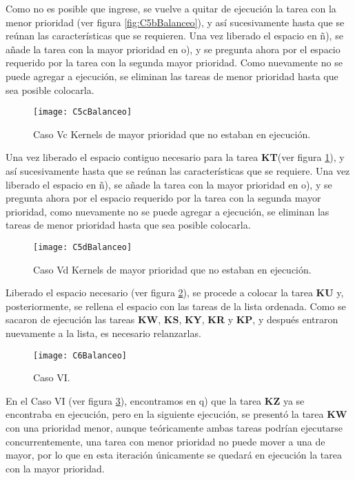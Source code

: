     Como no es posible que ingrese, se vuelve a quitar de ejecución la tarea con la menor prioridad (ver figura  \ref{fig:C5bBalanceo}), y así sucesivamente hasta que se reúnan las características que se requieren. Una vez liberado el espacio en ñ), se añade la tarea con la mayor prioridad en o), y se pregunta ahora por el espacio requerido por la tarea con la segunda mayor prioridad. Como nuevamente no se puede agregar a ejecución, se eliminan las tareas de menor prioridad hasta que sea posible colocarla.
\newline

    \begin{figure}[!]
      \centering
        \texttt{[image: C5cBalanceo]}
        \caption{Caso Vc Kernels de mayor prioridad que no estaban en ejecución.}
        \label{fig:C5cBalanceo}
    \end{figure}

    Una vez liberado el espacio contiguo necesario para la tarea \textbf{KT}(ver figura  \ref{fig:C5cBalanceo}), y así sucesivamente hasta que se reúnan las características que se requiere. Una vez liberado el espacio en ñ), se añade la tarea con la mayor prioridad en o), y se pregunta ahora por el espacio requerido por la tarea con la segunda mayor prioridad, como nuevamente no se puede agregar a ejecución, se eliminan las tareas de menor prioridad hasta que sea posible colocarla.
\newline
    
    \begin{figure}[!]
      \centering
        \texttt{[image: C5dBalanceo]}
        \caption{Caso Vd Kernels de mayor prioridad que no estaban en ejecución.}
        \label{fig:C5dBalanceo}
    \end{figure}

   Liberado el espacio necesario (ver figura  \ref{fig:C5dBalanceo}), se procede a colocar la tarea \textbf{KU} y, posteriormente, se rellena el espacio con las tareas de la lista ordenada. Como se sacaron de ejecución las tareas \textbf{KW}, \textbf{KS}, \textbf{KY}, \textbf{KR} y \textbf{KP}, y después entraron nuevamente a la lista, es necesario relanzarlas.
\newline

    \begin{figure}[!]
      \centering
        \texttt{[image: C6Balanceo]}
        \caption{Caso VI.}
        \label{fig:C6Balanceo}
    \end{figure}
    En el Caso VI (ver figura  \ref{fig:C6Balanceo}), encontramos en q) que la tarea \textbf{KZ} ya se encontraba en ejecución, pero en la siguiente ejecución, se presentó la tarea \textbf{KW} con una prioridad menor, aunque teóricamente ambas tareas podrían ejecutarse concurrentemente, una tarea con menor prioridad no puede mover a una de mayor, por lo que en esta iteración únicamente se quedará en ejecución la tarea con la mayor prioridad.
    

